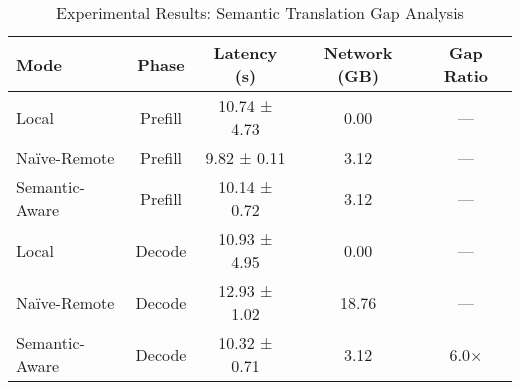 
\begin{table}[t]
\centering
\caption{Experimental Results: Semantic Translation Gap Analysis}
\label{tab:results}
\begin{tabular}{lcccc}
\toprule
\textbf{Mode} & \textbf{Phase} & \textbf{Latency (s)} & \textbf{Network (GB)} & \textbf{Gap Ratio} \\
\midrule
Local & Prefill & 10.74 ± 4.73 & 0.00 & — \\
Naïve-Remote & Prefill & 9.82 ± 0.11 & 3.12 & — \\
Semantic-Aware & Prefill & 10.14 ± 0.72 & 3.12 & — \\
\midrule
Local & Decode & 10.93 ± 4.95 & 0.00 & — \\
Naïve-Remote & Decode & 12.93 ± 1.02 & 18.76 & — \\
Semantic-Aware & Decode & 10.32 ± 0.71 & 3.12 & 6.0× \\
\bottomrule
\end{tabular}
\end{table}

